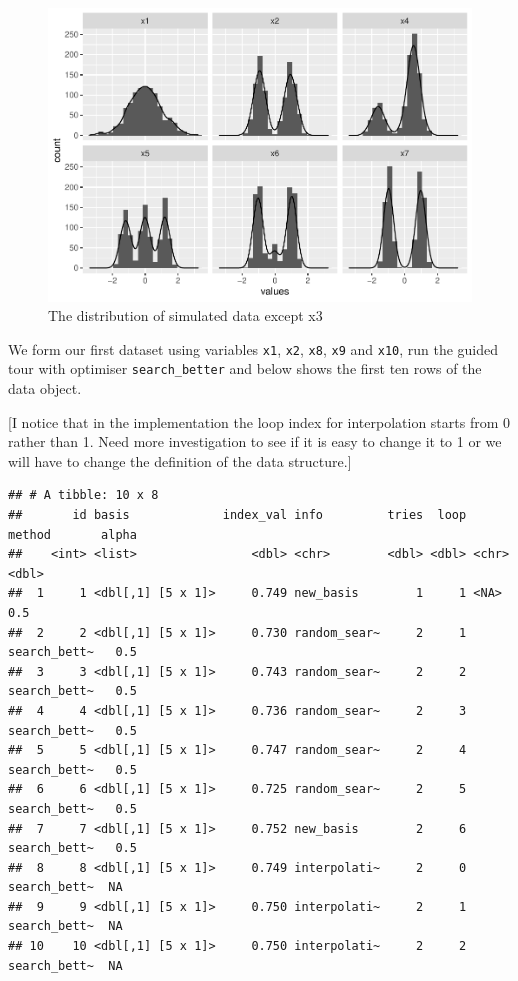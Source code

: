 \documentclass[12pt]{article}
\begin{document}
\begin{figure}
\centering
\includegraphics{paper_files/figure-latex/origin-data-1.pdf}
\caption{\label{origin-data} The distribution of simulated data except
x3}
\end{figure}

We form our first dataset using variables \texttt{x1}, \texttt{x2},
\texttt{x8}, \texttt{x9} and \texttt{x10}, run the guided tour with
optimiser \texttt{search\_better} and below shows the first ten rows of
the data object.

{[}I notice that in the implementation the loop index for interpolation
starts from 0 rather than 1. Need more investigation to see if it is
easy to change it to 1 or we will have to change the definition of the
data structure.{]}

\begin{verbatim}
## # A tibble: 10 x 8
##       id basis             index_val info         tries  loop method       alpha
##    <int> <list>                <dbl> <chr>        <dbl> <dbl> <chr>        <dbl>
##  1     1 <dbl[,1] [5 x 1]>     0.749 new_basis        1     1 <NA>           0.5
##  2     2 <dbl[,1] [5 x 1]>     0.730 random_sear~     2     1 search_bett~   0.5
##  3     3 <dbl[,1] [5 x 1]>     0.743 random_sear~     2     2 search_bett~   0.5
##  4     4 <dbl[,1] [5 x 1]>     0.736 random_sear~     2     3 search_bett~   0.5
##  5     5 <dbl[,1] [5 x 1]>     0.747 random_sear~     2     4 search_bett~   0.5
##  6     6 <dbl[,1] [5 x 1]>     0.725 random_sear~     2     5 search_bett~   0.5
##  7     7 <dbl[,1] [5 x 1]>     0.752 new_basis        2     6 search_bett~   0.5
##  8     8 <dbl[,1] [5 x 1]>     0.749 interpolati~     2     0 search_bett~  NA  
##  9     9 <dbl[,1] [5 x 1]>     0.750 interpolati~     2     1 search_bett~  NA  
## 10    10 <dbl[,1] [5 x 1]>     0.750 interpolati~     2     2 search_bett~  NA
\end{verbatim}
\end{document}
